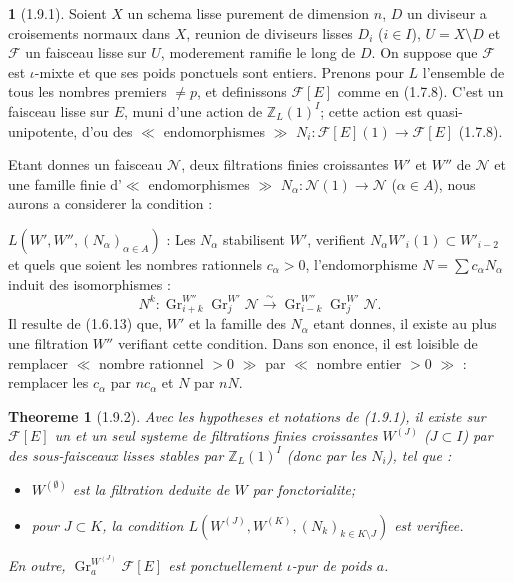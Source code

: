 \documentclass[12pt,a4paper]{article}
\theoremstyle{plain}
\newtheorem{theoreme}{Theoreme}[section]
\theoremstyle{definition}
\theoremstyle{definition}
\newtheorem{para}{}[section]
\theoremstyle{remark}
\DeclareMathOperator{\Gr}{Gr}
\begin{document}
\begin{para}[1.9.1]
Soient $X$ un schema lisse purement de dimension $n$, $D$ un diviseur a croisements normaux dans $X$, reunion de diviseurs lisses $D_i$ ($i \in I$), $U = X \setminus D$ et $\mathscr{F}$ un faisceau lisse sur $U$, moderement ramifie le long de $D$. On suppose que $\mathscr{F}$ est $\iota$-mixte et que ses poids ponctuels sont entiers. Prenons pour $L$ l'ensemble de tous les nombres premiers $\neq p$, et definissons $\mathscr{F}[E]$ comme en (1.7.8). C'est un faisceau lisse sur $E$, muni d'une action de $\mathbb{Z}_L(1)^I$; cette action est quasi-unipotente, d'ou des $\ll$ endomorphismes $\gg$ $N_i: \mathscr{F}[E](1) \to \mathscr{F}[E]$ (1.7.8).

Etant donnes un faisceau $\mathscr{N}$, deux filtrations finies croissantes $W'$ et $W''$ de $\mathscr{N}$ et une famille finie d'$\ll$ endomorphismes $\gg$ $N_\alpha: \mathscr{N}(1) \to \mathscr{N}$ ($\alpha \in A$), nous aurons a considerer la condition :

$L(W', W'', (N_\alpha)_{\alpha \in A})$ : Les $N_\alpha$ stabilisent $W'$, verifient $N_\alpha W'_i(1) \subset W'_{i-2}$ et quels que soient les nombres rationnels $c_\alpha > 0$, l'endomorphisme $N = \sum c_\alpha N_\alpha$ induit des isomorphismes :
\[N^k: \Gr_{i+k}^{W''} \Gr_j^{W'} \mathscr{N} \xrightarrow{\sim} \Gr_{i-k}^{W''} \Gr_j^{W'} \mathscr{N}.\]
Il resulte de (1.6.13) que, $W'$ et la famille des $N_\alpha$ etant donnes, il existe au plus une filtration $W''$ verifiant cette condition. Dans son enonce, il est loisible de remplacer $\ll$ nombre rationnel $> 0$ $\gg$ par $\ll$ nombre entier $> 0$ $\gg$ : remplacer les $c_\alpha$ par $nc_\alpha$ et $N$ par $nN$.
\end{para}

\begin{theoreme}[1.9.2]
Avec les hypotheses et notations de (1.9.1), il existe sur $\mathscr{F}[E]$ un et un seul systeme de filtrations finies croissantes $W^{(J)}$ ($J \subset I$) par des sous-faisceaux lisses stables par $\mathbb{Z}_L(1)^I$ (donc par les $N_i$), tel que :
\begin{itemize}[nosep]
\item[a)] $W^{(\emptyset)}$ est la filtration deduite de $W$ par fonctorialite;
\item[b)] pour $J \subset K$, la condition $L(W^{(J)}, W^{(K)}, (N_k)_{k \in K \setminus J})$ est verifiee.
\end{itemize}
En outre, $\Gr_a^{W^{(J)}} \mathscr{F}[E]$ est ponctuellement $\iota$-pur de poids $a$.
\end{theoreme}
\end{document}
